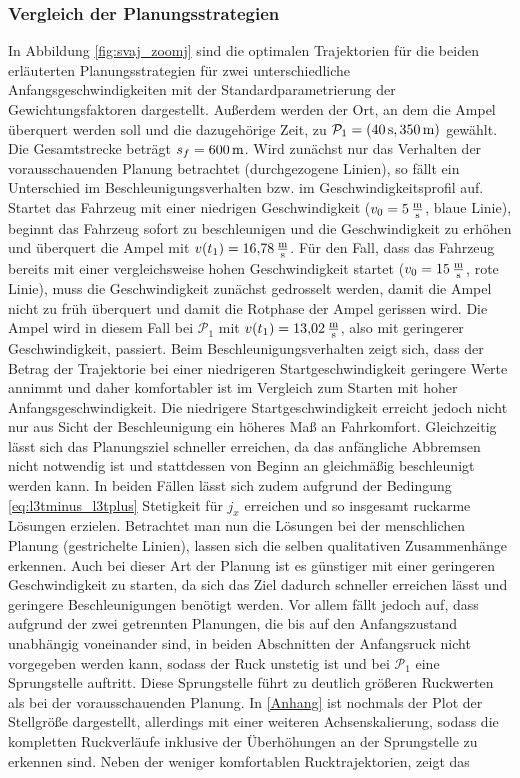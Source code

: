 \subsubsection{Vergleich der Planungsstrategien}\label{subsubsec:Vergleich}
In Abbildung \ref{fig:svaj_zoomj} sind die optimalen Trajektorien für die beiden erläuterten Planungsstrategien für zwei unterschiedliche Anfangsgeschwindigkeiten mit der Standardparametrierung der Gewichtungsfaktoren dargestellt. Außerdem werden der Ort, an dem die Ampel überquert werden soll und die dazugehörige Zeit, zu $\mathcal{P}_1 = (40\,\mathrm{s}, 350\,\mathrm{m})$ gewählt. Die Gesamtstrecke beträgt $s_f = 600\,\mathrm{m}$. Wird zunächst nur das Verhalten der vorausschauenden Planung betrachtet (durchgezogene Linien), so fällt ein Unterschied im Beschleunigungsverhalten bzw. im Geschwindigkeitsprofil auf. Startet das Fahrzeug mit einer niedrigen Geschwindigkeit ($v_0 = 5\,\mathrm{\frac{\mathrm{m}}{\mathrm{s}}}$, blaue Linie), beginnt das Fahrzeug sofort zu beschleunigen und die Geschwindigkeit zu erhöhen und überquert die Ampel mit $v(t_1) = 16{,}78\,\mathrm{\frac{\mathrm{m}}{\mathrm{s}}}$. Für den Fall, dass das Fahrzeug bereits mit einer vergleichsweise hohen Geschwindigkeit startet ($v_0 = 15\,\mathrm{\frac{\mathrm{m}}{\mathrm{s}}}$, rote Linie), muss die Geschwindigkeit zunächst gedrosselt werden, damit die Ampel nicht zu früh überquert und damit die Rotphase der Ampel gerissen wird. Die Ampel wird in diesem Fall bei $\mathcal{P}_1$ mit $v(t_1) = 13{,}02\,\mathrm{\frac{\mathrm{m}}{\mathrm{s}}}$, also mit geringerer Geschwindigkeit, passiert. Beim Beschleunigungsverhalten zeigt sich, dass der Betrag der Trajektorie bei einer niedrigeren Startgeschwindigkeit geringere Werte annimmt und daher komfortabler ist im Vergleich zum Starten mit hoher Anfangsgeschwindigkeit. Die niedrigere Startgeschwindigkeit erreicht jedoch nicht nur aus Sicht der Beschleunigung ein höheres Maß an Fahrkomfort. Gleichzeitig lässt sich das Planungsziel schneller erreichen, da das anfängliche Abbremsen nicht notwendig ist und stattdessen von Beginn an gleichmäßig beschleunigt werden kann. In beiden Fällen lässt sich zudem aufgrund der Bedingung \eqref{eq:l3tminus_l3tplus} Stetigkeit für $j_x$ erreichen und so insgesamt ruckarme Lösungen erzielen. Betrachtet man nun die Lösungen bei der menschlichen Planung (gestrichelte Linien), lassen sich die selben qualitativen Zusammenhänge erkennen. Auch bei dieser Art der Planung ist es günstiger mit einer geringeren Geschwindigkeit zu starten, da sich das Ziel dadurch schneller erreichen lässt und geringere Beschleunigungen benötigt werden. Vor allem fällt jedoch auf, dass aufgrund der zwei getrennten Planungen, die bis auf den Anfangszustand unabhängig voneinander sind, in beiden Abschnitten der Anfangsruck nicht vorgegeben werden kann, sodass der Ruck unstetig ist und bei $\mathcal{P}_1$ eine Sprungstelle auftritt. Diese Sprungstelle führt zu deutlich größeren Ruckwerten als bei der vorausschauenden Planung. In \ref{Anhang} ist nochmals der Plot der Stellgröße dargestellt, allerdings mit einer weiteren Achsenskalierung, sodass die kompletten Ruckverläufe inklusive der Überhöhungen an der Sprungstelle zu erkennen sind. Neben der weniger komfortablen Rucktrajektorien, zeigt das 